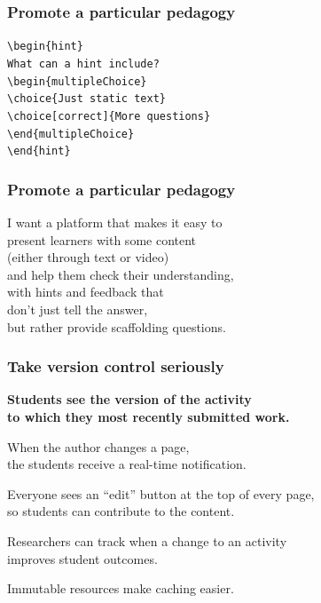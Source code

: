 \documentclass[aspectratio=169,14pt]{beamer}
\begin{document}
\begin{frame}
  \frametitle{Promote a particular pedagogy}
  \large

  \texttt{\textbackslash begin\{hint\}} \\
  \quad\texttt{What can a hint include?} \\
  \quad\texttt{\textbackslash begin\{multipleChoice\}} \\
  \quad\quad\texttt{\textbackslash choice\{Just static text\}} \\
  \quad\quad\texttt{\textbackslash choice[correct]\{More questions\}} \\
  \quad\texttt{\textbackslash end\{multipleChoice\}}   \\
  \texttt{\textbackslash end\{hint\}}
  
\end{frame}

\begin{frame}
  \frametitle{Promote a particular pedagogy}
  \Large
  
  I want a platform that makes it easy to \\
  \quad present learners with some content \\
  \quad\quad (either through text or video) \\
  \quad and help them check their understanding, \\
  \quad\quad with hints and feedback that \\
  \quad\quad\quad don't just tell the answer, \\
  \quad\quad\quad but rather provide scaffolding questions.
  
\end{frame}

\begin{frame}
  \frametitle{Take version control seriously}
  \large
  
  \textbf{Students see the version of the activity \\
  \quad to which they most recently submitted work.}

  \vfill  
  
  When the author changes a page, \\
  \quad the students receive a real-time notification.

  \vfill  
  
  Everyone sees an ``edit'' button at the top of every page, \\
  \quad so students can contribute to the content.
  
  \vfill

  Researchers can track when a change to an activity \\
  \quad improves student outcomes.

  \vfill

  Immutable resources make caching easier.
  
  \vfill
  \vfill
  \vfill
  
\end{frame}  
\end{document}

